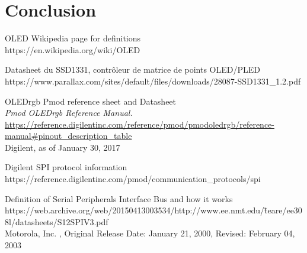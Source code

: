 \documentclass[11pt]{article}
\begin{document}
\newpage

\section{Conclusion}

\clearpage
\begin{thebibliography}{9}


OLED Wikipedia page for definitions\\
https://en.wikipedia.org/wiki/OLED

Datasheet du SSD1331, contrôleur de matrice de points OLED/PLED\\
https://www.parallax.com/sites/default/files/downloads/28087-SSD1331\_1.2.pdf

OLEDrgb Pmod reference sheet and Datasheet\\
\textit{Pmod OLEDrgb Reference Manual.} \\
\href{https://reference.digilentinc.com/reference/pmod/pmodoledrgb/reference-manual#pinout_description_table}{https://reference.digilentinc.com/reference/pmod/pmodoledrgb/reference-manual\#pinout\_description\_table}\\
Digilent, as of January 30, 2017

Digilent SPI protocol information\\
https://reference.digilentinc.com/pmod/communication\_protocols/spi

Definition of Serial Peripherals Interface Bus and how it works\\
https://web.archive.org/web/20150413003534/http://www.ee.nmt.edu/\~teare/ee308l/datasheets/S12SPIV3.pdf\\
Motorola, Inc. , Original Release Date: January 21, 2000, Revised: February 04, 2003

\end{thebibliography}
\end{document}
